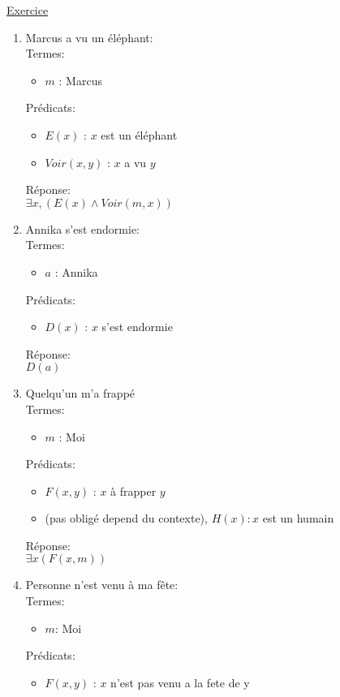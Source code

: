 \documentclass[12pt]{report}
\begin{document}
\underline{Exercice}
\begin{enumerate}
\item Marcus a vu un éléphant:\\
		Termes:
		\begin{itemize}
			\item $m$ : Marcus
			
		\end{itemize}
		Prédicats:\\
		\begin{itemize}
			\item $E(x)$ : $x$ est un éléphant
			\item $Voir(x,y)$ : $x$ a vu $y$
		\end{itemize}
		Réponse:\\
		$\exists x, (E(x) \wedge Voir(m,x))$
\item Annika s'est endormie:\\
		Termes:
		\begin{itemize}
			\item $a$ : Annika
		\end{itemize}
		Prédicats:\\
		\begin{itemize}
			\item $D(x)$ : $x$ s'est endormie
		\end{itemize}
		Réponse:\\
		$D(a)$
\newpage
\item Quelqu'un m'a frappé\\
		Termes:
		\begin{itemize}
			\item $m$ : Moi
		\end{itemize}
		Prédicats:\\
		\begin{itemize}
			\item $F(x,y)$ : $x$ à frapper $y$
			\item (pas obligé depend du contexte), $H(x) : x$ est un humain
		\end{itemize}
		Réponse:\\
		$\exists x (F(x,m))$
\item Personne n'est venu à ma fête:\\
		Termes:
		\begin{itemize}
			\item $m$: Moi
		\end{itemize}
		Prédicats:\\
		\begin{itemize}
			\item $F(x,y)$ : $x$ n'est pas venu a la fete de y

\end{itemize}
\end{enumerate}
\end{document}
